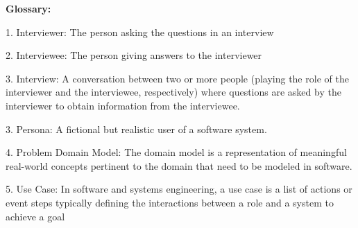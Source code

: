 \documentclass[12pt]{article}
\begin{document}
\vspace{\baselineskip}
\begin{justify}
\textbf{Glossary:}
\end{justify}\par

\begin{justify}
1. Interviewer: The person asking the questions in an interview
\end{justify}\par

\begin{justify}
2. Interviewee: The person giving answers to the interviewer
\end{justify}\par

\begin{justify}
3. Interview: A conversation between two or more people (playing the role of the interviewer and the interviewee, respectively) where questions are asked by the interviewer to obtain information from the interviewee.
\end{justify}\par

\begin{justify}
3. Persona: A fictional but realistic user of a software system.
\end{justify}\par

\begin{justify}
4. Problem Domain Model: The domain model is a representation of meaningful real-world concepts pertinent to the domain that need to be modeled in software.
\end{justify}\par

\begin{justify}
5. Use Case: In software and systems engineering, a use case is a list of actions or event steps typically defining the interactions between a role and a system to achieve a goal
\end{justify}\par


\vspace{\baselineskip}

\vspace{\baselineskip}

\vspace{\baselineskip}

\vspace{\baselineskip}
\end{document}
